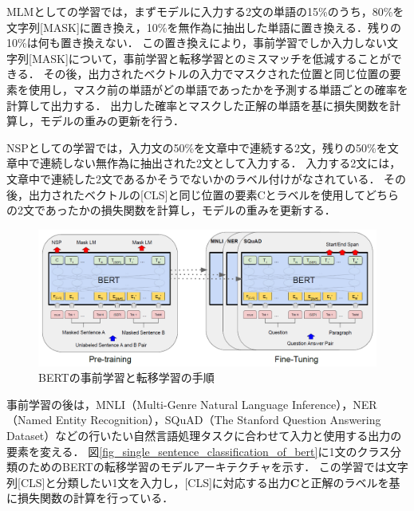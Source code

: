 \documentclass[12pt,a4j]{jreport}
\begin{document}
MLMとしての学習では，まずモデルに入力する2文の単語の15\%のうち，80\%を文字列[MASK]に置き換え，10\%を無作為に抽出した単語に置き換える．残りの10\%は何も置き換えない．
この置き換えにより，事前学習でしか入力しない文字列[MASK]について，事前学習と転移学習とのミスマッチを低減することができる．
その後，出力されたベクトルの入力でマスクされた位置と同じ位置の要素を使用し，マスク前の単語がどの単語であったかを予測する単語ごとの確率を計算して出力する．
出力した確率とマスクした正解の単語を基に損失関数を計算し，モデルの重みの更新を行う．

NSPとしての学習では，入力文の50\%を文章中で連続する2文，残りの50\%を文章中で連続しない無作為に抽出された2文として入力する．
入力する2文には，文章中で連続した2文であるかそうでないかのラベル付けがなされている．
その後，出力されたベクトルの[CLS]と同じ位置の要素Cとラベルを使用してどちらの2文であったかの損失関数を計算し，モデルの重みを更新する．

\begin{figure}[H]
	\centering
	\includegraphics[keepaspectratio, width=120mm]{img/fine-tuning-of-bert.png}
	\caption{BERTの事前学習と転移学習の手順\protect\footnotemark[5]}
	\label{fig_fine_tuning_of_bert}
\end{figure}

事前学習の後は，MNLI（Multi-Genre Natural Language Inference），NER（Named Entity Recognition），SQuAD（The Stanford Question Answering Dataset）などの行いたい自然言語処理タスクに合わせて入力と使用する出力の要素を変える．
図\ref{fig_single_sentence_classification_of_bert}に1文のクラス分類のためのBERTの転移学習のモデルアーキテクチャを示す．
この学習では文字列[CLS]と分類したい1文を入力し，[CLS]に対応する出力$\bm{C}$と正解のラベルを基に損失関数の計算を行っている．

\end{document}
